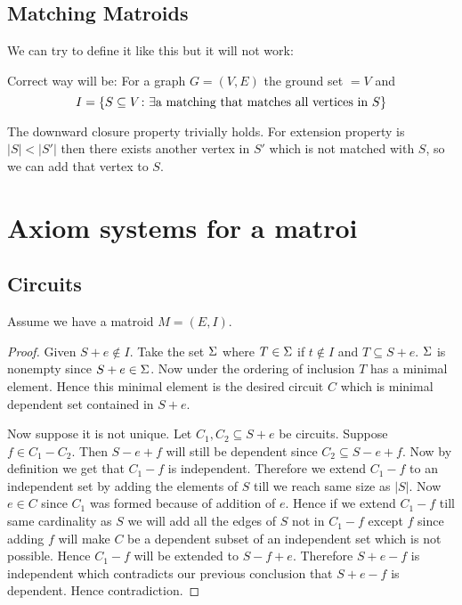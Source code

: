 \subsection{Matching Matroids}
We can try to define it like this but it will not work:
\parinf

Correct way will be: For a graph $G=(V,E)$ the ground set $=V$ and $$I=\{S\subseteq V\colon \exists \text{a matching that matches all vertices in $S$}\}$$\parinn

The downward closure property trivially holds. For extension property is $|S|<|S'|$ then there exists another vertex in $S'$ which is not matched with $S$, so we can add that vertex to $S$. 


\section{Axiom systems for a matroi}

\subsection{Circuits}
Assume we have a matroid $M=(E,I)$. 
\begin{proof}
	Given $S+e\notin I$. Take the set $\Sigma$ where $T\in \Sigma$ if $t\notin I$ and $T\subseteq S+e$. $\Sigma$ is nonempty since $S+e\in \Sigma$. Now under the ordering of inclusion $T$ has a minimal element. Hence this minimal element is the desired circuit $C$ which is minimal dependent set contained in $S+e$.
	
	Now suppose it is not unique. Let $C_1,C_2\subseteq S+e$ be circuits. Suppose $f\in C_1-C_2$. Then $S-e+f$ will still be dependent since $C_2\subseteq S-e+f$. Now by definition we get that $C_1-f$ is independent. Therefore we extend $C_1-f$ to an independent set by adding the elements of $S$ till we reach same size as $|S|$. Now $e\in C$ since $C_1$ was formed because of addition of $e$. Hence if we extend $C_1-f$ till same cardinality as $S$ we will add all the edges of $S$ not in $C_1-f$ except $f$ since adding $f$ will make $C$ be a dependent subset of an independent set which is not possible. Hence $C_1-f$ will be extended to $S-f+e$. Therefore $S+e-f$ is independent which contradicts our previous conclusion that $S+e-f$ is dependent. Hence contradiction.
\end{proof}